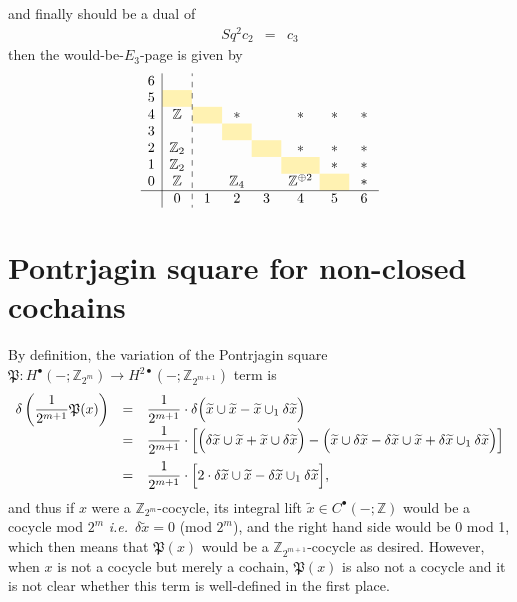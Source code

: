 \documentclass[12pt]{article}
\numberwithin{equation}{section}
\newcommand*{\green}[1]{\textcolor{darkgreen}{#1}}
\newcommand*{\black}[1]{\textcolor{black}{#1}}
\def\bZ{\mathbb{Z}}
\def\fP{\mathfrak{P}}
\begin{document}
and finally
\green{\fbox{\black{$d^2 : E^2_{6,0} \to E^2_{4,1}$}}} should be a dual of
\begin{equation}
	\begin{array}{ccccc}
		Sq^2 c_2 & = & c_3
	\end{array}
\end{equation}
then %
the would-be-$E_3$-page is given by
\begin{equation}
	\begin{array}{c|c:cccccccccccc}
		6  &&&&&& \\
		5  & \cellcolor{lightyellow} & \hphantom{\bZ_2} & \hphantom{\bZ_2} & \hphantom{\bZ_2} & \hphantom{\bZ_2} & \hphantom{\bZ_2} \\
		4  & \bZ & \cellcolor{lightyellow} & \ast && \ast & \ast & \ast\\
		3  &  && \cellcolor{lightyellow} &&&& \hphantom{\bZ_2}\\
		2  & \bZ_2 &&& \cellcolor{lightyellow} & \ast & \ast & \ast\\
		1  & \bZ_2 &&&& \cellcolor{lightyellow} & \ast & \ast\\
		0 & \bZ &  & \bZ_4 &  & \bZ^{\oplus 2} & \cellcolor{lightyellow} & \ast\\
		\hline
		& 0 & 1 & 2 & 3 & 4 & 5 & 6 \\
	\end{array}
\end{equation}


\section{Pontrjagin square for non-closed cochains}
\label{sec:nonclosedP}
By definition, the variation of the Pontrjagin square $\fP : H^\bullet(-;\bZ_{2^m}) \to H^{2\bullet}(-;\bZ_{2^{m+1}})$ term is
\begin{equation}
	\label{deltaPontrjagin}
	\begin{array}{ccl}
		\delta \left(\dfrac{1}{2^{m+1}}\fP(x)\right)
		& = & \dfrac{1}{2^{m+1}}\cdot \delta \Big(\widetilde x \cup \widetilde x - \widetilde x \cup_1 \delta \widetilde x\Big)\\
		& = & \dfrac{1}{2^{m+1}}\cdot\left[\Big(\delta \widetilde x \cup \widetilde x + \widetilde x \cup \delta \widetilde x\Big)
				- \Big(\widetilde x \cup \delta \widetilde x - \delta \widetilde x \cup \widetilde x + \delta \widetilde x \cup_1 \delta \widetilde x\Big)\right]\vspace{2mm}\\
		& = & \dfrac{1}{2^{m+1}}\cdot\Big[2\cdot \delta \widetilde x \cup \widetilde x - \delta \widetilde x \cup_1 \delta \widetilde x\Big],\\
	\end{array}
\end{equation}
and thus if $x$ were a $\bZ_{2^m}$-cocycle, 
its integral lift $\widetilde x \in C^\bullet(-;\bZ)$ would be a cocycle mod $2^m$ \textit{i.e.}~$\delta \widetilde x = 0$ (mod $2^m$),
and the right hand side would be $0$ mod 1,
which then means that $\fP(x)$ would be a $\bZ_{2^{m+1}}$-cocycle as desired.
However, when $x$ is not a cocycle but merely a cochain,
$\fP(x)$ is also not a cocycle and it is not clear whether this term is well-defined in the first place.
\end{document}
